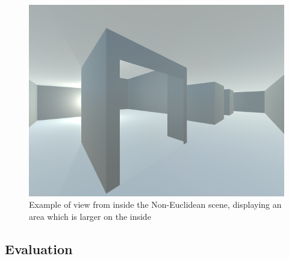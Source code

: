 		\begin{figure}[h]
			\label{design:fig:game}
			\includegraphics[width=1\textwidth]{Images/NE_View}
			\centering
			\caption{Example of view from inside the Non-Euclidean scene, displaying an area which is larger on the inside}
		\end{figure}

\begin{multicols*}{2}

	\section{Evaluation}


\end{multicols*}
